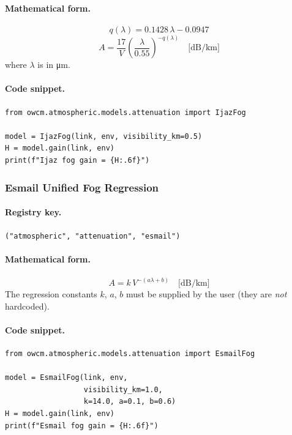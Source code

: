 \documentclass[11pt,a4paper]{article}
\begin{document}
\paragraph{Mathematical form.}
\begin{equation}
q(\lambda) = 0.1428\,\lambda - 0.0947
\end{equation}
\begin{equation}
\boxed{A = \frac{17}{V}\left(\frac{\lambda}{0.55}\right)^{-q(\lambda)}
\quad \text{[dB/km]}}
\end{equation}
where $\lambda$ is in \si{\micro m}.

\paragraph{Code snippet.}
\begin{lstlisting}
from owcm.atmospheric.models.attenuation import IjazFog

model = IjazFog(link, env, visibility_km=0.5)
H = model.gain(link, env)
print(f"Ijaz fog gain = {H:.6f}")
\end{lstlisting}

\subsubsection{Esmail Unified Fog Regression}
\label{sec:esmail}

\paragraph{Registry key.} \texttt{("atmospheric", "attenuation", "esmail")}

\paragraph{Mathematical form.}
\begin{equation}
\boxed{A = k\,V^{-(a\lambda + b)} \quad \text{[dB/km]}}
\end{equation}
The regression constants $k$, $a$, $b$ must be supplied by the user (they are
\emph{not} hardcoded).

\paragraph{Code snippet.}
\begin{lstlisting}
from owcm.atmospheric.models.attenuation import EsmailFog

model = EsmailFog(link, env,
                  visibility_km=1.0,
                  k=14.0, a=0.1, b=0.6)
H = model.gain(link, env)
print(f"Esmail fog gain = {H:.6f}")
\end{lstlisting}
\end{document}
